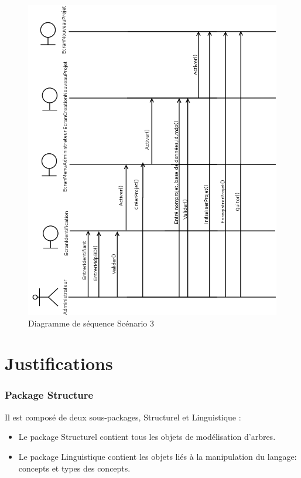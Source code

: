 \documentclass[12pt]{report}
\begin{document}
\begin{figure}[h!]
\begin{center}
\includegraphics[scale=0.34]{DiagSeq3.png}
\caption{Diagramme de séquence Scénario 3}
\end{center}
\end{figure}


\section{Justifications}


\subsubsection*{Package Structure}
Il est composé de deux sous-packages, Structurel et Linguistique :

\begin{itemize}
\item Le package Structurel contient tous les objets de modélisation d'arbres.
\item Le package Linguistique contient les objets liés à la manipulation du langage: concepts et types des concepts.
\end{itemize}
\end{document}
